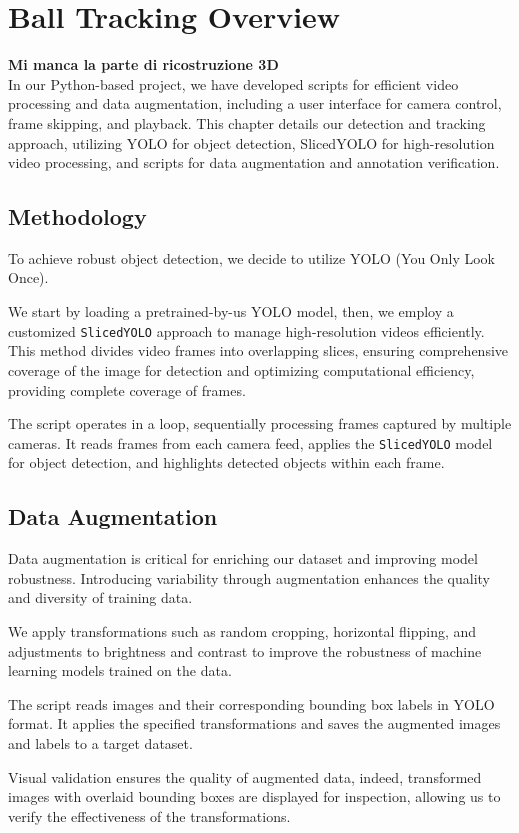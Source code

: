 \documentclass{template}
\begin{document}
\chapter{Ball Tracking Overview}
\textbf{Mi manca la parte di ricostruzione 3D}\\
In our Python-based project, we have developed scripts for efficient video processing and data augmentation, including a user interface for camera control, frame skipping, and playback. 
This chapter details our detection and tracking approach, utilizing YOLO for object detection, SlicedYOLO for high-resolution video processing, and scripts for data augmentation and annotation verification.

\section{Methodology}
To achieve robust object detection, we decide to utilize YOLO (You Only Look Once).

We start by loading a pretrained-by-us YOLO model, then, we employ a customized \texttt{SlicedYOLO} approach to manage high-resolution videos efficiently. 
This method divides video frames into overlapping slices, ensuring comprehensive coverage of the image for detection and optimizing computational efficiency, providing complete coverage of frames.

The script operates in a loop, sequentially processing frames captured by multiple cameras. 
It reads frames from each camera feed, applies the \texttt{SlicedYOLO} model for object detection, and highlights detected objects within each frame. 

\section{Data Augmentation}
Data augmentation is critical for enriching our dataset and improving model robustness. 
Introducing variability through augmentation enhances the quality and diversity of training data.

We apply transformations such as random cropping, horizontal flipping, and adjustments to brightness and contrast to improve the robustness of machine learning models trained on the data.

The script reads images and their corresponding bounding box labels in YOLO format. 
It applies the specified transformations and saves the augmented images and labels to a target dataset.

Visual validation ensures the quality of augmented data, indeed, transformed images with overlaid bounding boxes are displayed for inspection, allowing us to verify the effectiveness of the transformations.
\end{document}
